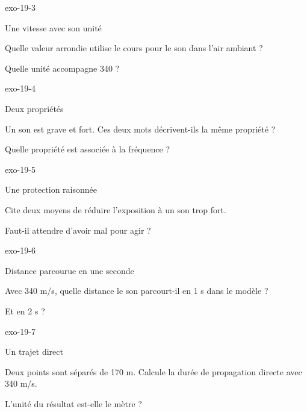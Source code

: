 \documentclass[12pt,twoside,openany]{book}
\begin{document}
\begin{blocLivre}{exo-19-3}
\begin{exercice}[1]{Une vitesse avec son unité}
\begin{questions}
\item Quelle valeur arrondie utilise le cours pour le son dans l’air ambiant ?
\item Quelle unité accompagne 340 ?
\end{questions}
\end{exercice}\end{blocLivre}
\begin{blocLivre}{exo-19-4}
\begin{exercice}[1]{Deux propriétés}
\begin{questions}
\item Un son est grave et fort. Ces deux mots décrivent-ils la même propriété ?
\item Quelle propriété est associée à la fréquence ?
\end{questions}
\end{exercice}\end{blocLivre}
\begin{blocLivre}{exo-19-5}
\begin{exercice}[1]{Une protection raisonnée}
\begin{questions}
\item Cite deux moyens de réduire l’exposition à un son trop fort.
\item Faut-il attendre d’avoir mal pour agir ?
\end{questions}
\end{exercice}\end{blocLivre}
\begin{blocLivre}{exo-19-6}
\begin{exercice}[2]{Distance parcourue en une seconde}
\begin{questions}
\item Avec 340 m/s, quelle distance le son parcourt-il en 1 s dans le modèle ?
\item Et en 2 s ?
\end{questions}
\end{exercice}\end{blocLivre}
\begin{blocLivre}{exo-19-7}
\begin{exercice}[2]{Un trajet direct}
\begin{questions}
\item Deux points sont séparés de 170 m. Calcule la durée de propagation directe avec 340 m/s.
\item L’unité du résultat est-elle le mètre ?
\end{questions}
\end{exercice}\end{blocLivre}
\end{document}

